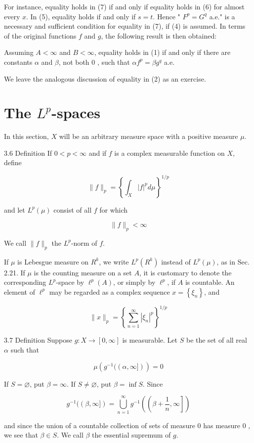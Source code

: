 \documentclass[10pt]{article}
\begin{document}
For instance, equality holds in (7) if and only if equality holds in (6) for almost every $x$. In (5), equality holds if and only if $s=t$. Hence " $F^{p}=G^{q}$ a.e." is a necessary and sufficient condition for equality in (7), if (4) is assumed. In terms of the original functions $f$ and $g$, the following result is then obtained:

Assuming $A<\infty$ and $B<\infty$, equality holds in (1) if and only if there are constants $\alpha$ and $\beta$, not both 0 , such that $\alpha f^{p}=\beta g^{q}$ a.e.

We leave the analogous discussion of equality in (2) as an exercise.

\section{The $L^{p}$-spaces}
In this section, $X$ will be an arbitrary measure space with a positive measure $\mu$.

3.6 Definition If $0<p<\infty$ and if $f$ is a complex measurable function on $X$, define

$$
\|f\|_{p}=\left\{\int_{X}|f|^{p} d \mu\right\}^{1 / p}
$$

and let $L^{p}(\mu)$ consist of all $f$ for which

$$
\|f\|_{p}<\infty
$$

We call $\|f\|_{p}$ the $L^{p}$-norm of $f$.

If $\mu$ is Lebesgue measure on $R^{k}$, we write $L^{p}\left(R^{k}\right)$ instead of $L^{p}(\mu)$, as in Sec. 2.21. If $\mu$ is the counting measure on a set $A$, it is customary to denote the corresponding $L^{p}$-space by $\ell^{p}(A)$, or simply by $\ell^{p}$, if $A$ is countable. An element of $\ell^{p}$ may be regarded as a complex sequence $x=\left\{\xi_{n}\right\}$, and

$$
\|x\|_{p}=\left\{\sum_{n=1}^{\infty}\left|\xi_{n}\right|^{p}\right\}^{1 / p}
$$

3.7 Definition Suppose $g: X \rightarrow[0, \infty]$ is measurable. Let $S$ be the set of all real $\alpha$ such that

$$
\mu\left(g^{-1}((\alpha, \infty])\right)=0
$$

If $S=\varnothing$, put $\beta=\infty$. If $S \neq \varnothing$, put $\beta=\inf S$. Since

$$
g^{-1}((\beta, \infty])=\bigcup_{n=1}^{\infty} g^{-1}\left(\left(\beta+\frac{1}{n}, \infty\right]\right)
$$

and since the union of a countable collection of sets of measure 0 has measure 0 , we see that $\beta \in S$. We call $\beta$ the essential supremum of $g$.
\end{document}
